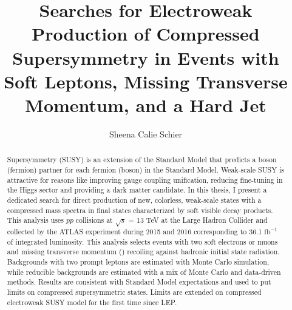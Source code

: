 \documentclass[11pt]{ucthesis}
\begin{document}

\title{Searches for Electroweak Production of Compressed Supersymmetry in Events with Soft Leptons, Missing Transverse Momentum, and a Hard Jet}
\author{Sheena Calie Schier}
\deanlinethree{}

\begin{frontmatter}

\maketitle
\copyrightpage

\tableofcontents
\listoffigures
\listoftables

\makeatletter
\newcommand{\rmnum}[1]{\romannumeral #1}
\newcommand{\Rmnum}[1]{\expandafter\@slowromancap\romannumeral #1@}
\makeatother

\begin{abstract}
Supersymmetry (SUSY) is an extension of the Standard Model that predicts a boson (fermion) partner for each fermion (boson) in the Standard Model. Weak-scale SUSY is attractive for reasons like improving gauge coupling unification, reducing fine-tuning in the Higgs sector and providing a dark matter candidate. In this thesis, I present a dedicated search for direct production of new, colorless, weak-scale states with a compressed mass spectra in final states characterized by soft visible decay products. This analysis uses $pp$ collisions at $\sqrt s$ = 13 TeV at the Large Hadron Collider and collected by the ATLAS experiment during 2015 and 2016 corresponding to 36.1 $\mathrm{fb}^{-1}$ of integrated luminosity. This analysis selects events with two soft electrons or muons and missing transverse momentum (\met{}) recoiling against hadronic initial state radiation. Backgrounds with two prompt leptons are estimated with Monte Carlo simulation, while reducible backgrounds are estimated with a mix of Monte Carlo and data-driven methods. Results are consistent with Standard Model expectations and used to put limits on compressed supersymmetric states.  Limits are extended on compressed electroweak SUSY model for the first time since LEP.


\end{abstract}
\end{frontmatter}
\end{document}
